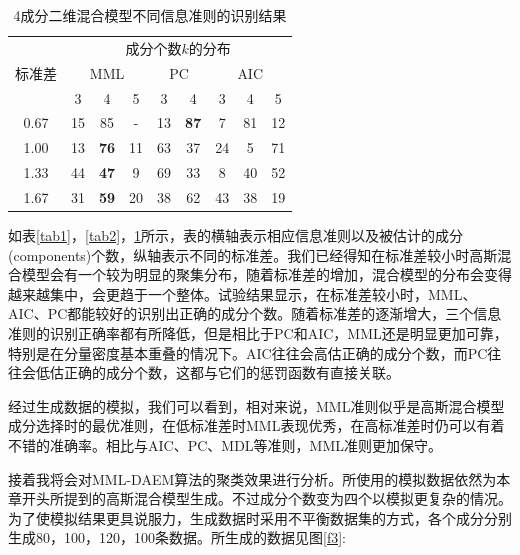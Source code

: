 \documentclass[a4paper,12pt,openany,oneside,utf-8]{ctexbook}
\begin{document}
    \begin{table}[H]
    \centering
    \caption{4成分二维混合模型不同信息准则的识别结果}
    \label{tab3}
    \begin{tabular}{ccccccccc}
    \hline
    \multirow{3}{*}{标准差} & \multicolumn{8}{c}{成分个数$k$的分布}                                                   \\ \cline{2-9} 
                         & \multicolumn{3}{c}{MML} & \multicolumn{2}{c}{PC} & \multicolumn{3}{c}{AIC} \\ \cline{2-9} 
                         & 3   & 4            & 5  & 3     & 4              & 3      & 4      & 5     \\ \hline
    0.67                 & 15  & 85  & -  & 13    & \textbf{87}             & 7      & 81     & 12    \\ \hline
    1.00                 & 13  & \textbf{76}  & 11 & 63    & 37             & 24     & 5      & 71    \\ \hline
    1.33                 & 44  & \textbf{47}           & 9  & 69    & 33    & 8     & 40     & 52     \\ \hline
    1.67                 & 31  & \textbf{59}  & 20 & 38    & 62             & 43     & 38     & 19    \\ \hline
    \end{tabular}
    \end{table}
    
    如表\ref{tab1}，\ref{tab2}，\ref{tab3}所示，表的横轴表示相应信息准则以及被估计的成分(components)个数，纵轴表示不同的标准差。我们已经得知在标准差较小时高斯混合模型会有一个较为明显的聚集分布，随着标准差的增加，混合模型的分布会变得越来越集中，会更趋于一个整体。试验结果显示，在标准差较小时，MML、AIC、PC都能较好的识别出正确的成分个数。随着标准差的逐渐增大，三个信息准则的识别正确率都有所降低，但是相比于PC和AIC，MML还是明显更加可靠，特别是在分量密度基本重叠的情况下。AIC往往会高估正确的成分个数，而PC往往会低估正确的成分个数，这都与它们的惩罚函数有直接关联。
    
    经过生成数据的模拟，我们可以看到，相对来说，MML准则似乎是高斯混合模型成分选择时的最优准则，在低标准差时MML表现优秀，在高标准差时仍可以有着不错的准确率。相比与AIC、PC、MDL等准则，MML准则更加保守。
    
	接着我将会对MML-DAEM算法的聚类效果进行分析。所使用的模拟数据依然为本章开头所提到的高斯混合模型生成。不过成分个数变为四个以模拟更复杂的情况。为了使模拟结果更具说服力，生成数据时采用不平衡数据集的方式，各个成分分别生成80，100，120，100条数据。所生成的数据见图\ref{f3}:
	
\end{document}
